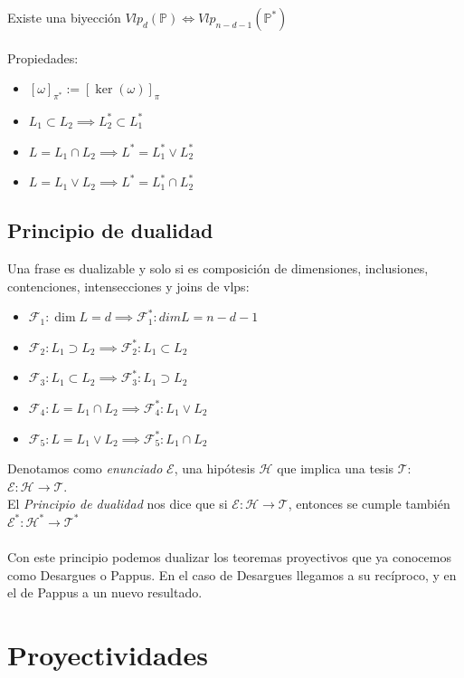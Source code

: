 \documentclass[leqno]{article}
\renewcommand{\P}{\mathbb{P}}
\begin{document}
Existe una biyección $Vlp_d(\P) \iff Vlp_{n-d-1}(\P^*)$ \\
\\

Propiedades:
\begin{itemize}
  \item $[\omega]_{\pi^*} := [\ker(\omega)]_\pi$
  \item $L_1\subset L_2 \implies L_2^*\subset L_1^*$
  \item $L = L_1\cap L_2 \implies L^* = L_1^* \vee L_2^*$
  \item $L = L_1\vee L_2 \implies L^* = L_1^* \cap L_2^*$

\end{itemize}

\subsection{Principio de dualidad}
Una frase es dualizable y solo si es composición de dimensiones, inclusiones, contenciones, intensecciones y joins de vlps:
\begin{itemize}
  \item $\mathcal{F}_1: \dim L = d \implies \mathcal{F}_1^*: dim L = n-d-1$
  \item $\mathcal{F}_2: L_1 \supset L_2 \implies \mathcal{F}_2^*: L_1 \subset L_2$
  \item $\mathcal{F}_3: L_1 \subset L_2 \implies \mathcal{F}_3^*: L_1 \supset L_2$
  \item $\mathcal{F}_4: L = L_1 \cap L_2 \implies \mathcal{F}_4^*: L_1 \vee L_2$
  \item $\mathcal{F}_5: L = L_1 \vee L_2 \implies \mathcal{F}_5^*: L_1 \cap L_2$
\end{itemize}
Denotamos como \textit{enunciado} $\mathcal{E}$, una hipótesis $\mathcal{H}$ que implica una tesis $\mathcal{T}$: $\mathcal{E}: \mathcal{H}\to \mathcal{T}$.\\
El \textit{Principio de dualidad} nos dice que si  $\mathcal{E}: \mathcal{H}\to \mathcal{T}$, entonces se cumple también $\mathcal{E}^*: \mathcal{H}^*\to \mathcal{T}^*$ \\
\\
Con este principio podemos dualizar los teoremas proyectivos que ya conocemos como Desargues o Pappus. En el caso de Desargues llegamos a su recíproco, y en el de Pappus a un nuevo resultado.




\section{Proyectividades}
\end{document}
